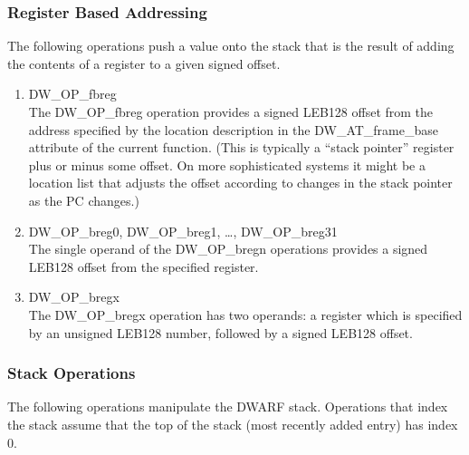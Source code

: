 \subsubsection{Register Based Addressing}
\label{chap:registerbasedaddressing}
The following operations push a value onto the stack that is
the result of adding the contents of a register to a given
signed offset.

\begin{enumerate}[1]

\item DW\_OP\_fbreg \\
The DW\_OP\_fbreg operation provides a signed LEB128 offset
from the address specified by the location description in the
DW\_AT\_frame\_base attribute of the current function. (This
is typically a “stack pointer” register plus or minus
some offset. On more sophisticated systems it might be a
location list that adjusts the offset according to changes
in the stack pointer as the PC changes.)

\item DW\_OP\_breg0, DW\_OP\_breg1, \dots, DW\_OP\_breg31\\
The single operand of the DW\_OP\_bregn operations provides
a signed LEB128 offset from
the specified register.

\item DW\_OP\_bregx \\
The DW\_OP\_bregx operation has two operands: a register
which is specified by an unsigned LEB128 number, followed by
a signed LEB128 offset.

\end{enumerate}


\subsubsection{Stack Operations}
\label{chap:stackoperations}
The following operations manipulate the DWARF stack. Operations
that index the stack assume that the top of the stack (most
recently added entry) has index 0.

